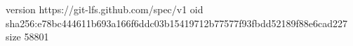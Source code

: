 version https://git-lfs.github.com/spec/v1
oid sha256:e78bc444611b693a166f6ddc03b15419712b77577f93fbdd52189f88e6cad227
size 58801

